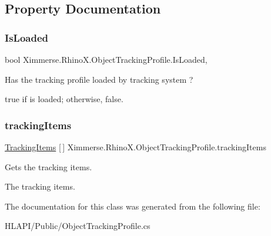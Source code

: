 \subsection{Property Documentation}
\mbox{\label{class_ximmerse_1_1_rhino_x_1_1_object_tracking_profile_a3749a2ba2e7a79434c61475897b8d664}} 
\subsubsection{\texorpdfstring{Is\+Loaded}{IsLoaded}}
{\footnotesize\ttfamily bool Ximmerse.\+Rhino\+X.\+Object\+Tracking\+Profile.\+Is\+Loaded\hspace{0.3cm}{\ttfamily [get]}, {\ttfamily [set]}}



Has the tracking profile loaded by tracking system ? 

{\ttfamily true} if is loaded; otherwise, {\ttfamily false}.\mbox{\label{class_ximmerse_1_1_rhino_x_1_1_object_tracking_profile_ad9d2e13ef6fdf8e901f7ee53cf42a7d3}} 
\subsubsection{\texorpdfstring{tracking\+Items}{trackingItems}}
{\footnotesize\ttfamily \mbox{\hyperlink{class_ximmerse_1_1_rhino_x_1_1_object_tracking_profile_1_1_tracking_items}{Tracking\+Items}} \mbox{[}$\,$\mbox{]} Ximmerse.\+Rhino\+X.\+Object\+Tracking\+Profile.\+tracking\+Items\hspace{0.3cm}{\ttfamily [get]}}



Gets the tracking items. 

The tracking items.

The documentation for this class was generated from the following file\+:\begin{DoxyCompactItemize}
\item 
H\+L\+A\+P\+I/\+Public/Object\+Tracking\+Profile.\+cs\end{DoxyCompactItemize}
